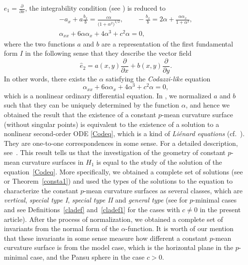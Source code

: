 \documentclass[10pt,a4paper]{amsart}
\numberwithin{equation}{section}
\begin{document}
$e_{1}=\frac{\partial}{\partial x}$,
 the integrability condition (see \cite{ChiuH/LiuH:2022}) is reduced to
\begin{gather}
-a_{x}+a\frac{b_{x}}{b}=\frac{c\alpha}{\bigl(1+\alpha^2\bigr)^{1/2}},\qquad
-\frac{b_{x}}{b}=2\alpha+\frac{\alpha\alpha_{x}}{1+\alpha^2},\nonumber\\
\alpha_{xx}+6\alpha\alpha_{x}+4\alpha^{3}+c^{2}\alpha=0,\label{intcon}
\end{gather}
where the two functions $a$ and $b$ are a representation of the first fundamental form $I$ in the following sense that they describe the vector field
\begin{equation*}
\hat{e}_{2}=a(x, y)\frac{\partial}{\partial x}+b(x, y)\frac{\partial}{\partial y}.
\end{equation*}
In other words, there exists the $\alpha$ satisfying the \emph{Codazzi-like} equation
\begin{equation}\label{Codeq}
\alpha_{xx}+6\alpha\alpha_{x}+4\alpha^{3}+c^{2}\alpha=0,
\end{equation}
which is a nonlinear ordinary differential equation. In \cite{ChiuH/LiuH:2022}, we normalized $a$ and $b$ such that they can be uniquely determined by the function $\alpha$, and hence we obtained the result that the existence of a constant $p$-mean curvature surface (without singular points) is equivalent to the existence of a solution to a nonlinear second-order ODE \eqref{Codeq}, which is a kind of \emph{Li\'{e}nard equations} (cf.\ \cite{Polyanin/Zaitsev:2003}). They are one-to-one correspondences in some sense. For a detailed description, see~\cite[Theorems~1.1, 1.3 and~6.3]{ChiuH/LiuH:2022}. This result tells us that the investigation of the geometry of constant $p$-mean curvature surfaces in $H_{1}$ is equal to the study of the solution of the equation~\eqref{Codeq}. More specifically, we obtained a complete set of solutions (see \cite[Theorems~1.2 and~1.4]{ChiuH/LiuH:2022} or Theorem~\ref{consta1}) and used the types of the solutions to the equation to characterize the constant $p$-mean curvature surfaces as several classes, which are \emph{vertical}, \emph{special type I}, \emph{special type II} and \emph{general type} (see \cite[Definitions 5.1 and 5.2]{ChiuH/LiuH:2022} for $p$-minimal cases and see Definitions~\ref{cladef} and~\ref{cladef1} for the cases with $c\neq 0$ in the present article). After the process of normalization, we obtained a complete set of invariants from the normal form of the $\alpha$-function. It is worth of our mention that these invariants in some sense measure how different a constant $p$-mean curvature surface is from the model case, which is the horizontal plane in the $p$-minimal case, and the Pansu sphere in the case $c>0$.
\end{document}
